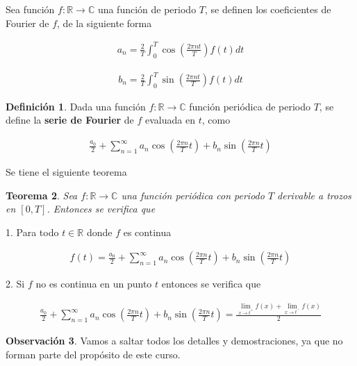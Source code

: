 \documentclass{article}
\theoremstyle{plain}
\newtheorem{thm}{Teorema}[section]
\theoremstyle{definition}
\newtheorem{defin}[thm]{Definición}
\newtheorem{rmk}[thm]{Observación}
\begin{document}
Sea función $f:\mathbb{R} \to \mathbb{C}$ una función de periodo $T$, se definen los coeficientes de Fourier de $f$, de la siguiente forma


\begin{align*}
    a_n = \frac{2}{T} \int_0^T \cos \left( \frac{2\pi n t}{T}\right) f(t) dt
\end{align*}

\begin{align*}
    b_n = \frac{2}{T} \int_0^T \sin \left( \frac{2\pi n t}{T}\right) f(t) dt
\end{align*}

\begin{defin}Dada una función $f:\mathbb{R} \to \mathbb{C}$ función periódica de periodo $T$, se define la \textbf{serie de  Fourier} de $f$ evaluada en $t$, como
\end{defin}

\begin{align*}
  \frac{a_0}{2}+ \sum_{n=1}^\infty a_n\cos \left( \frac{2\pi n}{T} t  \right) +b_n\sin \left( \frac{2\pi n}{T} t  \right)
\end{align*}

Se tiene el siguiente teorema  \\

\begin{thm}Sea $f: \mathbb{R} \to \mathbb{C}$ una función periódica con periodo $T$ derivable a trozos en $[0,T]$. Entonces se verifica que \\
\end{thm}

1.  Para todo $t \in \mathbb{R}$ donde $f$ es continua

\begin{align*}
    f(t) = \frac{a_0}{2}+ \sum_{n=1}^\infty a_n\cos \left( \frac{2\pi n}{T} t  \right) +b_n\sin \left( \frac{2\pi n}{T} t  \right)
\end{align*}

2. Si $f$ no es continua en un punto $t$ entonces se verifica que

\begin{align*}
 \frac{a_0}{2}+ \sum_{n=1}^\infty a_n\cos \left( \frac{2\pi n}{T} t  \right) +b_n\sin \left( \frac{2\pi n}{T} t  \right) = \frac{\displaystyle\lim_{x \to t^+}f(x)+\lim_{x \to t^-}f(x) }{2}
\end{align*}


\begin{rmk}Vamos a saltar todos los detalles y demostraciones, ya que no forman parte del propósito de este curso. \\
\end{rmk}
\end{document}
